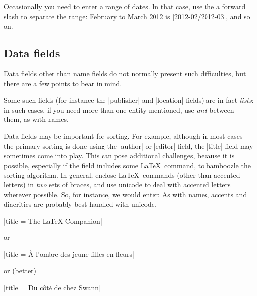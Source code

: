Occasionally you need to enter a range of dates. In that case, use the
a forward slash to separate the range: February to March 2012 is
|2012-02/2012-03|, and so on.

\subsection{Data fields}

Data fields other than name fields do not normally present such
difficulties, but there are a few points to bear in mind.

Some such fields (for instance the |publisher| and |location| fields)
are in fact \emph{lists}: in such cases, if you need more than one
entity mentioned, use \emph{and} between them, as with names.

Data fields may be important for sorting. For example, although in
most cases the primary sorting is done using the |author| or |editor|
field, the |title| field may sometimes come into play. This can pose
additional challenges, because it is possible, especially if the field
includes some \LaTeX\ command, to bamboozle the sorting algorithm. In
general, enclose \LaTeX\ commands (other than accented letters) in
\emph{two} sets of braces, and use unicode to deal with accented
letters wherever possible. So, for instance, we would
enter: As with names,
accents and diacritics are probably best handled with unicode.
\begin{center}
|title = {The {{\LaTeX}} Companion}|

or

|title = {{\`A} l'ombre des jeune filles en fleurs}|

or (better)

|title = {Du côté de chez Swann}|
\end{center}

